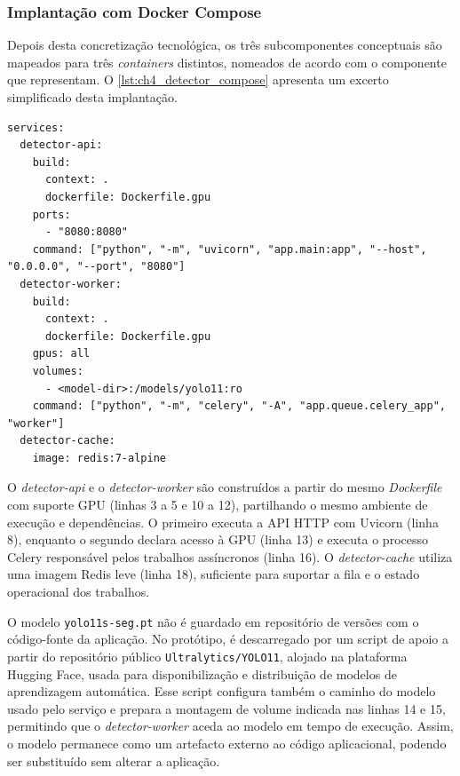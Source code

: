 \subsubsection{Implantação com Docker Compose}
Depois desta concretização tecnológica, os três subcomponentes conceptuais são mapeados para três \textit{containers} distintos, nomeados de acordo com o componente que representam. O \autoref{lst:ch4_detector_compose} apresenta um excerto simplificado desta implantação.

\par\noindent\begin{minipage}{\linewidth}
\begin{lstlisting}[caption={Excerto simplificado da implantação do serviço de deteção (yaml)},label={lst:ch4_detector_compose}]
services:
  detector-api:
    build:
      context: .
      dockerfile: Dockerfile.gpu
    ports:
      - "8080:8080"
    command: ["python", "-m", "uvicorn", "app.main:app", "--host", "0.0.0.0", "--port", "8080"]
  detector-worker:
    build:
      context: .
      dockerfile: Dockerfile.gpu
    gpus: all
    volumes:
      - <model-dir>:/models/yolo11:ro
    command: ["python", "-m", "celery", "-A", "app.queue.celery_app", "worker"]
  detector-cache:
    image: redis:7-alpine
\end{lstlisting}
\end{minipage}

O \textit{detector-api} e o \textit{detector-worker} são construídos a partir do mesmo \textit{Dockerfile} com suporte \gls{GPU} (linhas 3 a 5 e 10 a 12), partilhando o mesmo ambiente de execução e dependências. O primeiro executa a \gls{API} \gls{HTTP} com Uvicorn (linha 8), enquanto o segundo declara acesso à \gls{GPU} (linha 13) e executa o processo Celery responsável pelos trabalhos assíncronos (linha 16). O \textit{detector-cache} utiliza uma imagem Redis leve (linha 18), suficiente para suportar a fila e o estado operacional dos trabalhos.

O modelo \texttt{yolo11s-seg.pt} não é guardado em repositório de versões com o código-fonte da aplicação. No protótipo, é descarregado por um script de apoio a partir do repositório público \texttt{Ultralytics/YOLO11}, alojado na plataforma Hugging Face, usada para disponibilização e distribuição de modelos de aprendizagem automática. Esse script configura também o caminho do modelo usado pelo serviço e prepara a montagem de volume indicada nas linhas 14 e 15, permitindo que o \textit{detector-worker} aceda ao modelo em tempo de execução. Assim, o modelo permanece como um artefacto externo ao código aplicacional, podendo ser substituído sem alterar a aplicação.

